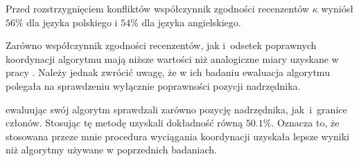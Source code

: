 Przed rozstrzygnięciem konfliktów współczynnik zgodności recenzentów $\kappa$ wyniósł $56\%$ dla języka polskiego i $54\%$ dla języka angielskiego.

Zarówno współczynnik zgodności recenzentów, jak i~odsetek poprawnych koordynacji algorytmu mają niższe wartości niż analogiczne miary uzyskane w pracy \cite{przepiorkowski2023conjunct}. Należy jednak zwrócić uwagę, że w ich badaniu ewaluacja algorytmu polegała na sprawdzeniu wyłącznie poprawności pozycji nadrzędnika. 

\cite{przepiorkowski2024argument} ewaluując swój algorytm sprawdzali zarówno pozycję nadrzędnika, jak~i~granice członów. Stosując tę metodę uzyskali dokładność równą $50.1\%$. Oznacza to, że stosowana przeze mnie procedura wyciągania koordynacji uzyskała lepsze wyniki niż algorytmy używane w poprzednich badaniach.